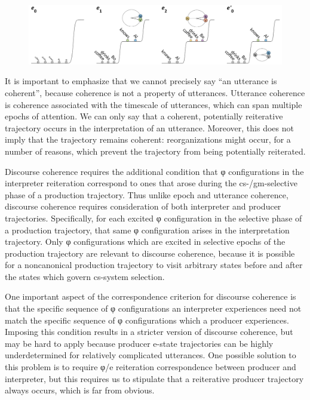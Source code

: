   
\begin{figure}
\includegraphics[width=\textwidth]{figures/Tilsen-img126.png}
\caption{\missingcaption}
\label{fig:6:7}
\end{figure}
 

  It is important to emphasize that we cannot precisely say “an utterance is coherent”, because coherence is not a property of utterances. Utterance coherence is coherence associated with the timescale of utterances, which can span multiple epochs of attention. We can only say that a coherent, potentially reiterative trajectory occurs in the interpretation of an utterance. Moreover, this does not imply that the trajectory remains coherent: reorganizations might occur, for a number of reasons, which prevent the trajectory from being potentially reiterated.

  Discourse coherence requires the additional condition that φ configurations in the interpreter reiteration correspond to ones that arose during the cs-/gm-selective phase of a production trajectory. Thus unlike epoch and utterance coherence, discourse coherence requires consideration of both interpreter and producer trajectories. Specifically, for each excited φ configuration in the selective phase of a production trajectory, that same φ configuration arises in the interpretation trajectory. Only φ configurations which are excited in selective epochs of the production trajectory are relevant to discourse coherence, because it is possible for a noncanonical production trajectory to visit arbitrary states before and after the states which govern cs-system selection. 

  One important aspect of the correspondence criterion for discourse coherence is that the specific sequence of φ configurations an interpreter experiences need not match the specific sequence of φ configurations which a producer experiences. Imposing this condition results in a stricter version of discourse coherence, but may be hard to apply because producer e-state trajectories can be highly underdetermined for relatively complicated utterances. One possible solution to this problem is to require φ/e reiteration correspondence between producer and interpreter, but this requires us to stipulate that a reiterative producer trajectory always occurs, which is far from obvious.

